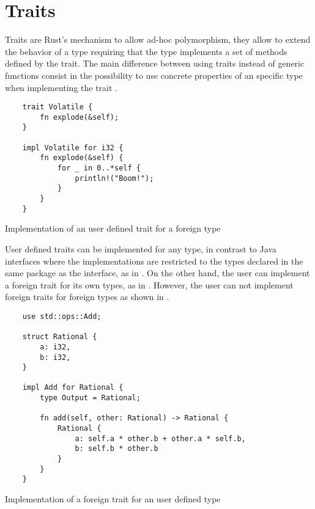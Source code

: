 \section{Traits}
\label{sec:traits}

Traits are Rust's mechanism to allow ad-hoc polymorphism, they allow to extend
the behavior of a type requiring that the type implements a set of methods
defined by the trait. The main difference between using traits instead of
generic functions consist in the possibility to use concrete properties of an
specific type when implementing the trait \cite{traits}.

\begin{listing}[h]
	\begin{verbatim}
    trait Volatile {
        fn explode(&self);
    }

    impl Volatile for i32 {
        fn explode(&self) {
            for _ in 0..*self {
                println!("Boom!");
            }
        }
    }
    \end{verbatim}
  \caption{Implementation of an user defined trait for a foreign type}
  \label{lst:trait_foreign_impl}
\end{listing}

User defined traits can be implemented for any type, in contrast to Java
interfaces where the implementations are restricted to the types declared in the
same package as the interface, as in . On the other
hand, the user can implement a foreign trait for its own types, as in
. However, the user can not implement foreign traits
for foreign types as shown in .

\begin{listing}[h]
	\begin{verbatim}
    use std::ops::Add;

    struct Rational {
        a: i32,
        b: i32,
    }

    impl Add for Rational {
        type Output = Rational;
        
        fn add(self, other: Rational) -> Rational {
            Rational {
                a: self.a * other.b + other.a * self.b,
                b: self.b * other.b
            }
        }
    }
    \end{verbatim}
  \caption{Implementation of a foreign trait for an user defined type}
  \label{lst:foreign_trait_impl}
\end{listing}


